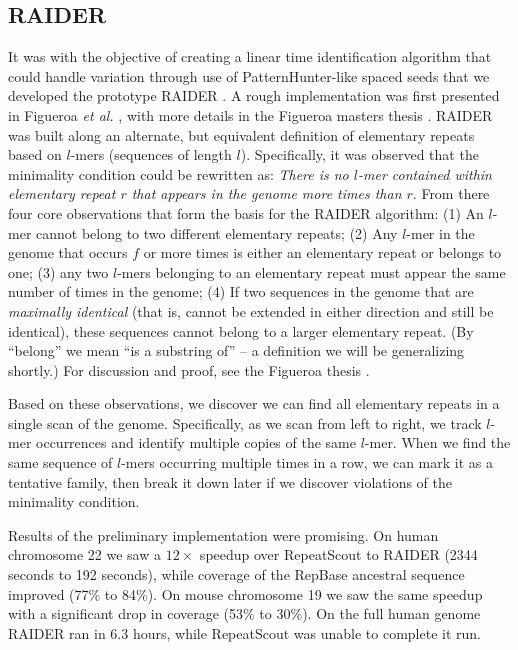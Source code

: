 \documentclass[11pt,letterpaper]{amsart}
\begin{document}
\subsection*{RAIDER}
\label{RAIDERSec}
It was with the objective of creating a linear time identification
algorithm that could handle variation through use of
PatternHunter-like spaced seeds that we developed the prototype RAIDER
\cite{Li:2004wl}.  A rough implementation was first presented in
Figueroa {\it et al.} \cite{Figueroa:2014uk}, with more details in the Figueroa masters
thesis \cite{Figueroa:2013cz}.  RAIDER was built along
an alternate, but equivalent definition of elementary repeats based on
$l$-mers (sequences of length $l$).  Specifically, it was observed
that the minimality condition could be rewritten as: {\it There is no
$l$-mer contained within elementary repeat $r$ that appears in the
genome more times than $r$}.  From there four core observations
that form the basis for the RAIDER algorithm: (1) An $l$-mer cannot
belong to two different elementary repeats; (2) Any $l$-mer in the
genome that occurs $f$ or more times is either an elementary repeat or
belongs to one; (3) any two $l$-mers belonging to an elementary repeat
must appear the same number of times in the genome; (4) If two
sequences in the genome that are {\it maximally identical} (that is,
cannot be extended in either direction and still be identical), these
sequences cannot belong to a larger elementary repeat.  (By ``belong''
we mean ``is a substring of'' -- a definition we will be generalizing
shortly.)  For discussion and proof, see the Figueroa thesis
\cite{Figueroa:2013cz}.

Based on these observations, we discover we can find all elementary
repeats in a single scan of the genome.  Specifically, as we scan from
left to right, we track $l$-mer occurrences and identify multiple
copies of the same $l$-mer.  When we find the same sequence of $l$-mers
occurring multiple times in a row, we can mark it as a tentative family,
then break it down later if we discover violations of the minimality
condition.  

Results of the preliminary implementation were promising. On human
chromosome 22 we saw a $12\times$ speedup over RepeatScout to RAIDER
(2344 seconds to 192 seconds), while coverage of the RepBase
\cite{Jurka:2005bl} ancestral sequence improved (77\% to 84\%).  On
mouse chromosome 19 we saw the same speedup with a significant drop in
coverage (53\% to 30\%).  On the full human genome RAIDER ran in $6.3$
hours, while RepeatScout was unable to complete it run.  
\end{document}
